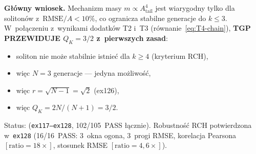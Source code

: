 \bigskip
\noindent\textbf{G\l{}\'owny wniosek.}
Mechanizm masy $m \propto A_{\mathrm{tail}}^4$ jest wiarygodny tylko
dla soliton\'ow z~$\mathrm{RMSE}/A < 10\%$, co ogranicza stabilne
genera\-cje do $k \leq 3$.  W~po\l{}\k{a}czeniu z~wynikami
dodatk\'ow T2 i~T3 (r\'ownanie~\ref{eq:T4-chain}),
\textbf{TGP PRZEWIDUJE $Q_K = 3/2$ z~pierwszych zasad}:
\begin{itemize}
  \item soliton nie mo\.ze stabilnie istnie\'c dla $k \geq 4$
    (kryterium RCH),
  \item wi\k{e}c $N = 3$ genera\-cje --- jedyna mo\.zliwo\'s\'c,
  \item wi\k{e}c $r = \sqrt{N-1} = \sqrt{2}$ (ex126),
  \item wi\k{e}c $Q_K = 2N/(N+1) = 3/2$.
\end{itemize}
Status: 
(\texttt{ex117--ex128}, 102/105~PASS \l{}\k{a}cznie).
Robustno\'s\'c RCH potwierdzona w~\texttt{ex128}
(16/16~PASS: 3~okna ogona, 3~progi RMSE, korelacja Pearsona
$[\text{ratio}=18{\times}]$, stosunek RMSE $[\text{ratio}=4{,}6{\times}]$).
